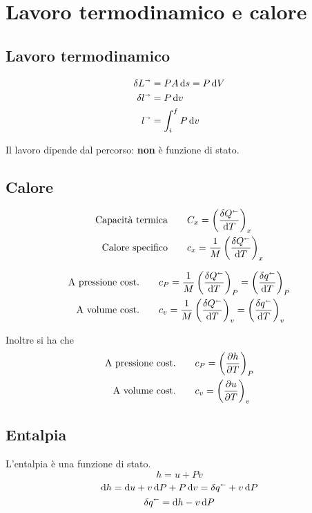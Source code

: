 \section{Lavoro termodinamico e calore}

\subsection{Lavoro termodinamico}

\begin{align*}
    \delta L^\shortrightarrow &= PA\dd{s} = P\dd{V} \\
    \delta l^\shortrightarrow &= P\dd{v} \\
    l^\shortrightarrow &= \int_i^f P\dd{v}
\end{align*}

Il lavoro dipende dal percorso: \textbf{non} è funzione di stato.

\subsection{Calore}

\begin{align*}
    \text{Capacità termica} &\qquad C_x = \left(\frac{\delta Q^\shortleftarrow}{\dd{T}}\right)_x \\
    \text{Calore specifico} &\qquad c_x = \frac{1}{M} \left(\frac{\delta Q^\shortleftarrow}{\dd{T}}\right)_x
\end{align*}

\begin{align*}
    \text{A pressione cost.} &\qquad c_P = \frac{1}{M} \left(\frac{\delta Q^\shortleftarrow}{\dd{T}}\right)_P = \left(\frac{\delta q^\shortleftarrow}{\dd{T}}\right)_P \\
    \text{A volume cost.} &\qquad c_v = \frac{1}{M} \left(\frac{\delta Q^\shortleftarrow}{\dd{T}}\right)_v = \left(\frac{\delta q^\shortleftarrow}{\dd{T}}\right)_v
\end{align*}

Inoltre si ha che
\begin{align*}
    \text{A pressione cost.} &\qquad c_P = \qty(\pdv{h}{T})_P\\
    \text{A volume cost.} &\qquad c_v = \qty(\pdv{u}{T})_v
\end{align*}

\subsection{Entalpia}

L'entalpia è una funzione di stato.
\[ h = u + Pv \]
\[ \dd{h} = \dd{u} + v\dd{P} + P\dd{v} = \delta q^\shortleftarrow + v\dd{P} \]
\[ \delta q^\shortleftarrow = \dd{h} - v\dd{P} \]
